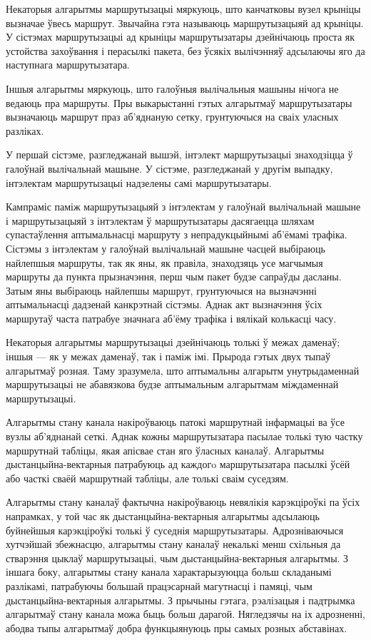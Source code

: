 Некаторыя алгарытмы маршрутызацыі мяркуюць, што канчатковы вузел крыніцы вызначае ўвесь маршрут. Звычайна гэта называюць маршрутызацыяй ад крыніцы. У сістэмах маршрутызацыі ад крыніцы маршрутызатары дзейнічаюць проста як устойства захоўвання і перасылкі пакета, без ўсякіх вылічэнняў адсылаючы яго да наступнага маршрутызатара.

Іншыя алгарытмы мяркуюць, што галоўныя вылічальныя машыны нічога не ведаюць пра маршруты. Пры выкарыстанні гэтых алгарытмаў маршрутызатары вызначаюць маршрут праз аб'яднаную сетку, грунтуючыся на сваіх уласных разліках.

У першай сістэме, разгледжанай вышэй, інтэлект маршрутызацыі знаходзіцца ў галоўнай вылічальнай машыне. У сістэме, разгледжанай у другім выпадку, інтэлектам маршрутызацыі надзелены самі маршрутызатары.

Кампраміс паміж маршрутызацыяй з інтэлектам у галоўнай
вылічальнай машыне і маршрутызацыяй з інтэлектам ў маршрутызатары дасягаецца шляхам супастаўлення аптымальнасці маршруту з непрадукцыйнымі аб'ёмамі трафіка. Сістэмы з інтэлектам у галоўнай вылічальнай машыне часцей выбіраюць найлепшыя маршруты, так як яны, як правіла, знаходзяць усе магчымыя маршруты да пункта прызначэння, перш чым пакет будзе сапраўды дасланы. Затым яны выбіраюць найлепшы маршрут, грунтуючыся на вызначэнні аптымальнасці дадзенай канкрэтнай сістэмы. Аднак акт вызначэння ўсіх маршрутаў часта патрабуе значнага аб'ёму трафіка і вялікай колькасці часу.

Некаторыя алгарытмы маршрутызацыі дзейнічаюць толькі ў межах даменаў; іншыя --- як у межах даменаў, так і паміж імі. Прырода гэтых двух тыпаў алгарытмаў розная. Таму зразумела, што аптымальны алгарытм унутрыдаменнай маршрутызацыі не абавязкова будзе аптымальным
алгарытмам міждаменнай маршрутызацыі.

Алгарытмы стану канала накіроўваюць патокі маршрутнай інфармацыі ва ўсе вузлы аб'яднанай сеткі. Аднак кожны маршрутызатара пасылае толькі тую частку маршрутнай табліцы, якая апісвае стан яго ўласных каналаў. Алгарытмы дыстанцыйна-вектарныя патрабуюць ад каждогo маршрутызатара пасылкі ўсёй або часткі сваёй маршрутнай табліцы, але толькі сваім суседзям.

Алгарытмы стану каналаў фактычна накіроўваюць невялікія карэкціроўкі па ўсіх напрамках, у той час як дыстанцыйна-вектарныя алгарытмы адсылаюць буйнейшыя карэкціроўкі толькі ў суседнія маршрутызатары.
Адрозніваючыся хутчэйшай збежнасцю, алгарытмы стану каналаў некалькі менш схільныя да стварэння цыклаў маршрутызацыі, чым дыстанцыйна-вектарныя алгарытмы. З іншага боку, алгарытмы стану канала характарызуюцца больш складанымі разлікамі, патрабуючы большай працэсарнай магутнасці і памяці, чым дыстанцыйна-вектарныя алгарытмы. З прычыны гэтага, рэалізацыя і падтрымка алгарытмаў стану канала можа быць больш дарагой. Нягледзячы на іх адрозненні, абодва тыпы алгарытмаў добра функцыянуюць пры самых розных абставінах.

